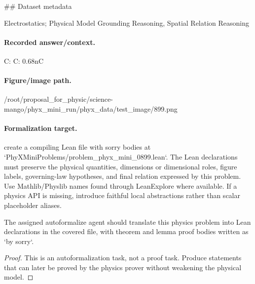 \#\# Dataset metadata

Electrostatics; Physical Model Grounding Reasoning, Spatial Relation Reasoning

\paragraph{Recorded answer/context.}
C: C: 0.68nC

\paragraph{Figure/image path.}
/root/proposal\_for\_physic/science-mango/phyx\_mini\_run/phyx\_data/test\_image/899.png

\paragraph{Formalization target.}
create a compiling Lean file with sorry bodies at `PhyXMiniProblems/problem\_phyx\_mini\_0899.lean`. The Lean declarations must preserve the physical quantities, dimensions or dimensional roles, figure labels, governing-law hypotheses, and final relation expressed by this problem.
Use Mathlib/Physlib names found through LeanExplore where available. If a physics API is missing, introduce faithful local abstractions rather than scalar placeholder aliases.

\begin{theorem}
\label{thm:physics:phyx_mini_0899:target}
The assigned autoformalize agent should translate this physics problem into Lean declarations in the covered file, with theorem and lemma proof bodies written as `by sorry`.
\end{theorem}
\begin{proof}
This is an autoformalization task, not a proof task. Produce statements that can later be proved by the physics prover without weakening the physical model.
\end{proof}

